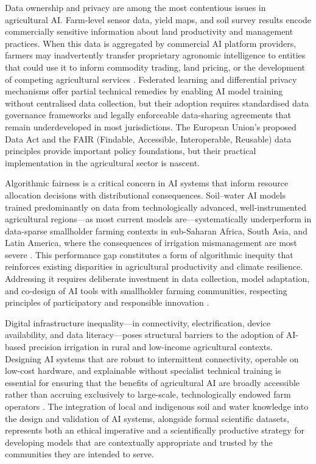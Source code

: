 \documentclass[land,article,submit,pdftex,moreauthors]{Definitions/mdpi}
\numberwithin{equation}{section}
\begin{document}
Data ownership and privacy are among the most contentious issues in agricultural AI. Farm-level sensor data, yield maps, and soil survey results encode commercially sensitive information about land productivity and management practices. When this data is aggregated by commercial AI platform providers, farmers may inadvertently transfer proprietary agronomic intelligence to entities that could use it to inform commodity trading, land pricing, or the development of competing agricultural services \citep{WolfButtel}. Federated learning and differential privacy mechanisms \citep{dwork2014algorithmic} offer partial technical remedies by enabling AI model training without centralised data collection, but their adoption requires standardised data governance frameworks and legally enforceable data-sharing agreements that remain underdeveloped in most jurisdictions. The European Union's proposed Data Act and the FAIR (Findable, Accessible, Interoperable, Reusable) data principles \citep{wilkinson2016fair} provide important policy foundations, but their practical implementation in the agricultural sector is nascent.

Algorithmic fairness is a critical concern in AI systems that inform resource allocation decisions with distributional consequences. Soil--water AI models trained predominantly on data from technologically advanced, well-instrumented agricultural regions---as most current models are---systematically underperform in data-sparse smallholder farming contexts in sub-Saharan Africa, South Asia, and Latin America, where the consequences of irrigation mismanagement are most severe \citep{Xuetal2023}. This performance gap constitutes a form of algorithmic inequity that reinforces existing disparities in agricultural productivity and climate resilience. Addressing it requires deliberate investment in data collection, model adaptation, and co-design of AI tools with smallholder farming communities, respecting principles of participatory and responsible innovation \citep{janssen2020responsible}.

Digital infrastructure inequality---in connectivity, electrification, device availability, and data literacy---poses structural barriers to the adoption of AI-based precision irrigation in rural and low-income agricultural contexts. Designing AI systems that are robust to intermittent connectivity, operable on low-cost hardware, and explainable without specialist technical training is essential for ensuring that the benefits of agricultural AI are broadly accessible rather than accruing exclusively to large-scale, technologically endowed farm operators \citep{shepherd2022ethics}. The integration of local and indigenous soil and water knowledge into the design and validation of AI systems, alongside formal scientific datasets, represents both an ethical imperative and a scientifically productive strategy for developing models that are contextually appropriate and trusted by the communities they are intended to serve.
\end{document}
